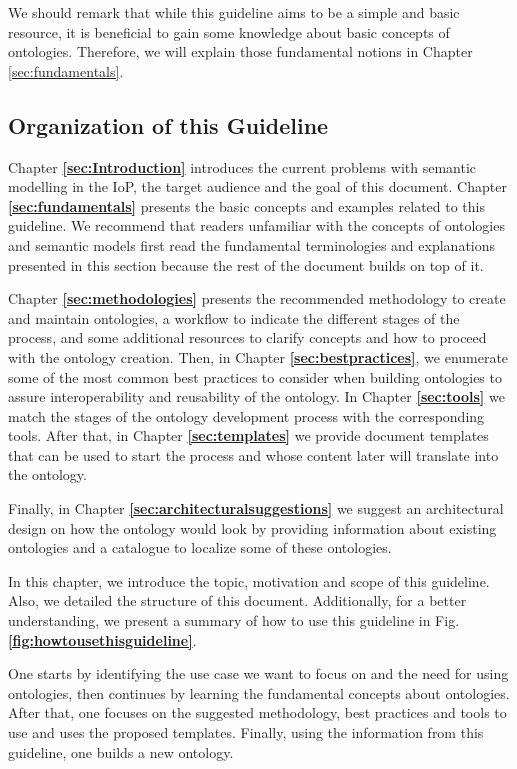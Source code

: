 \documentclass{guideline/sty/rapport}
\begin{document}
We should remark that while this guideline aims to be a simple and basic resource, it is beneficial to gain some knowledge about basic concepts of ontologies. Therefore, we will explain those fundamental notions in Chapter \ref{sec:fundamentals}.

\subsection{Organization of this Guideline}

Chapter \textbf{\ref{sec:Introduction}}  introduces the current problems with semantic modelling in the IoP, the target audience and the goal of this document. Chapter \textbf{\ref{sec:fundamentals}} presents the basic concepts and examples related to this guideline. We recommend that readers unfamiliar with the concepts of ontologies and semantic models first read the fundamental terminologies and explanations presented in this section because the rest of the document builds on top of it. \singlespacing

Chapter \textbf{\ref{sec:methodologies}} presents the recommended methodology to create and maintain ontologies, a workflow to indicate the different stages of the process, and some additional resources to clarify concepts and how to proceed with the ontology creation. Then, in Chapter \textbf{\ref{sec:bestpractices}}, we enumerate some of the most common best practices to consider when building ontologies to assure interoperability and reusability of the ontology. In Chapter \textbf{\ref{sec:tools}} we match the stages of the ontology development process with the corresponding tools. After that, in Chapter \textbf{\ref{sec:templates}} we provide document templates that can be used to start the process and whose content later will translate into the ontology. \singlespacing

Finally, in Chapter \textbf{\ref{sec:architecturalsuggestions}} we suggest an architectural design on how the ontology would look by providing information about existing ontologies and a catalogue to localize some of these ontologies. \singlespacing

In this chapter, we introduce the topic, motivation and scope of this guideline. Also, we detailed the structure of this document. Additionally, for a better understanding, we present a summary of how to use this guideline in Fig. \textbf{\ref{fig:howtousethisguideline}}. 

One starts by identifying the use case we want to focus on and the need for using ontologies, then continues by learning the fundamental concepts about ontologies. After that, one focuses on the suggested methodology, best practices and tools to use and uses the proposed templates. Finally, using the information from this guideline, one builds a new ontology.
\end{document}
